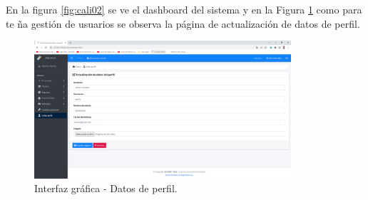 	\vspace{-0.6cm} %
	
	En la figura \ref{fig:cali02} se ve el dashboard del sistema y en la Figura \ref{fig:cali08} como para te ña gestión de usuarios se observa la página de actualización de datos de perfil.
	
	\vspace{0.3cm} %
	
	\begin{figure}[!h] %
		\caption[Interfaz gráfica - Datos de perfil]
		{\newline Interfaz gráfica - Datos de perfil.} %
		\centering
		\includegraphics[width=0.85\textwidth]{imagenes/cap_3/Img_calibus/CALIBUS08.png} %
		
		\begin{flushleft}
		\end{flushleft}
		\vspace{-16pt}
		\label{fig:cali08} %
	\end{figure}
	

